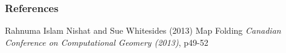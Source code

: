 \documentclass{beamer}
\begin{document}


\begin{frame}
\frametitle{References}
\footnotesize{
\begin{thebibliography}{99} %



 Rahnuma Islam Nishat and Sue Whitesides (2013)
\newblock Map Folding
\newblock \emph{Canadian Conference on Computational Geomery (2013)}, p49-52

\end{thebibliography}
}
\end{frame}




\end{document}
